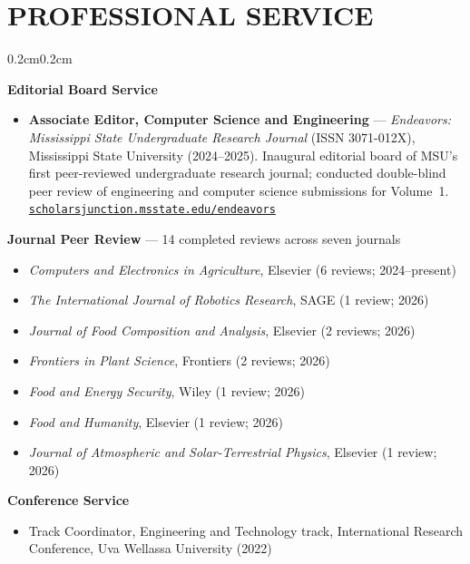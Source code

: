 \documentclass[10pt, letterpaper]{article}
\newenvironment{highlights}{%
    \begin{itemize}[topsep=0.08cm, parsep=0.08cm, partopsep=0pt,
                    itemsep=0pt, leftmargin=0.4cm + 10pt]
}{\end{itemize}}
\newenvironment{onecolentry}{%
    \begin{adjustwidth}{0.2cm}{0.2cm}
}{\end{adjustwidth}}
\begin{document}
\section{PROFESSIONAL SERVICE}
\vspace{0.08cm}
\begin{onecolentry}
    \textbf{Editorial Board Service}
    \begin{highlights}
        \item \textbf{Associate Editor, Computer Science and Engineering} ---
              \emph{Endeavors: Mississippi State Undergraduate Research Journal}
              (ISSN 3071-012X), Mississippi State University (2024--2025).
              Inaugural editorial board of MSU's first peer-reviewed undergraduate
              research journal; conducted double-blind peer review of engineering
              and computer science submissions for Volume~1.
              \\ \href{https://scholarsjunction.msstate.edu/endeavors/}{\texttt{scholarsjunction.msstate.edu/endeavors}}
    \end{highlights}
    \vspace{0.10cm}
    \textbf{Journal Peer Review} --- 14 completed reviews across seven journals
    \begin{highlights}
        \item \emph{Computers and Electronics in Agriculture}, Elsevier
              (6 reviews; 2024--present)
        \item \emph{The International Journal of Robotics Research}, SAGE
              (1 review; 2026)
        \item \emph{Journal of Food Composition and Analysis}, Elsevier (2 reviews; 2026)
        \item \emph{Frontiers in Plant Science}, Frontiers (2 reviews; 2026)
        \item \emph{Food and Energy Security}, Wiley (1 review; 2026)
        \item \emph{Food and Humanity}, Elsevier (1 review; 2026)
        \item \emph{Journal of Atmospheric and Solar-Terrestrial Physics}, Elsevier
              (1 review; 2026)
    \end{highlights}
    \vspace{0.10cm}
    \textbf{Conference Service}
    \begin{highlights}
        \item Track Coordinator, Engineering and Technology track, International
              Research Conference, Uva Wellassa University (2022)

\end{highlights}
\end{onecolentry}
\end{document}
